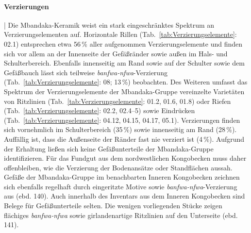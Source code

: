 \paragraph{Verzierungen}\hspace{-.5em}|\hspace{.5em}%
Die Mbandaka-Keramik weist ein stark eingeschränktes Spektrum an Verzierungselementen auf. Horizontale Rillen (Tab.~\ref{tab:Verzierungselemente}: 02.1) entsprechen etwa 56\,\% aller aufgenommen Verzierungselemente und finden sich vor allem an der Innenseite der Gefäßränder sowie außen im Hals- und Schulterbereich. Ebenfalls innenseitig am Rand sowie auf der Schulter sowie dem Gefäßbauch lässt sich teilweise \textit{banfwa-nfwa}-Verzierung (Tab.~\ref{tab:Verzierungselemente}: 08; 13\,\%) beobachten. Des Weiteren umfasst das Spektrum der Verzierungselemente der Mbandaka-Gruppe vereinzelte Varietäten von Ritzlinien (Tab.~\ref{tab:Verzierungselemente}: 01.2, 01.6, 01.8) oder Riefen (Tab.~\ref{tab:Verzierungselemente}: 02.2, 02.4--5) sowie Eindrücken (Tab.~\ref{tab:Verzierungselemente}: 04.12, 04.15, 04.17, 05.1). Verzierungen finden sich vornehmlich im Schulterbereich (35\,\%) sowie innenseitig am Rand (28\,\%). Auffällig ist, dass die Außenseite der Ränder fast nie verziert ist (4\,\%). Aufgrund der Erhaltung ließen sich keine Gefäßunterteile der Mbandaka-Gruppe identifizieren. Für das Fundgut aus dem nordwestlichen Kongobecken muss daher offenbleiben, wie die Verzierung der Bodenansätze oder Standflächen aussah. Gefäße der Mbandaka-Gruppe im benachbarten Inneren Kongobecken zeichnen sich ebenfalls regelhaft durch eingeritzte Motive sowie \textit{banfwa-nfwa}-Verzierung aus (ebd. 140). Auch innerhalb des Inventars aus dem Inneren Kongobecken sind Belege für Gefäßunterteile selten. Die wenigen vorliegenden Stücke zeigen flächiges \textit{banfwa-nfwa} sowie girlandenartige Ritzlinien auf den Unterseite (ebd. 141).


